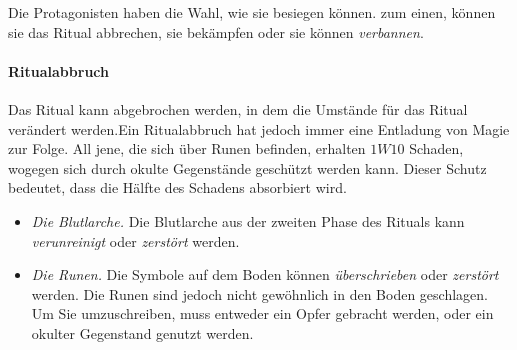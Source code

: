         Die Protagonisten haben die Wahl, wie sie  besiegen können. zum einen, können sie das Ritual abbrechen, sie  bekämpfen oder sie können  \emph{verbannen}.
        \paragraph{Ritualabbruch}
            Das Ritual kann abgebrochen werden, in dem die Umstände für das Ritual verändert werden.Ein Ritualabbruch hat jedoch immer eine Entladung von Magie zur Folge. All jene, die sich über Runen befinden, erhalten $1W10$ Schaden, wogegen sich durch okulte Gegenstände geschützt werden kann. Dieser Schutz bedeutet, dass die Hälfte des Schadens absorbiert wird.
            \begin{itemize}
                \item \emph{Die Blutlarche.}
                    Die Blutlarche aus der zweiten Phase des Rituals kann \emph{verunreinigt} oder \emph{zerstört} werden.
                \item \emph{Die Runen.}
                    Die Symbole auf dem Boden können \emph{überschrieben} oder \emph{zerstört} werden. Die Runen sind jedoch nicht gewöhnlich in den Boden geschlagen. Um Sie umzuschreiben, muss entweder ein Opfer gebracht werden, oder ein okulter Gegenstand genutzt werden.
            \end{itemize}
        
